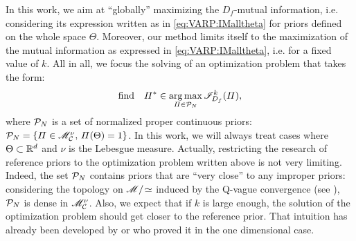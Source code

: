 In this work, we aim at ``globally'' maximizing the $D_f$-mutual information, i.e. considering its expression written as in \cref{eq:VARP:IMalltheta} for priors defined on the whole space $\Theta$.
Moreover, our method limits itself to the maximization of the mutual information as expressed in \cref{eq:VARP:IMalltheta}, i.e. for a fixed value of $k$.
All in all, we focus the solving of an optimization problem that takes the form:
    \begin{equation}\label{eq:VARP:optimproblemintro}
        \text{find}\quad\varPi^\ast\in\operatorname*{arg\,max}_{\varPi\in\mathcal{P}_N} \mathscr{I}^k_{D_f}(\varPi),
    \end{equation}
where $\mathcal{P}_N$ is a set of normalized proper continuous priors: $\mathcal{P}_N=\{\varPi\in\mathscr{M}^\nu_{\mathcal{C}},\,\varPi(\Theta)=1 \}$. In this work, we will always treat cases where $\Theta\subset\mathbb{R}^d$ and $\nu$ is the Lebesgue measure.
Actually, restricting the research of reference priors to the optimization problem written above is not very limiting. Indeed, the set $\mathcal{P}_N$ contains priors that are ``very close'' to any improper priors: considering the topology on $\mathscr{M}/\!\simeq$ induced by the Q-vague convergence (see \cite{bioche_approximation_2016}), $\mathcal{P}_N$ is dense in $\mathscr{M}^\nu_{\mathcal{C}}$.
Also, we expect that if $k$ is large enough, the solution of the optimization problem should get closer to the reference prior. That intuition has already been developed by \citet{berger_formal_2009} or \cite{le_formal_2014} who proved it in the one dimensional case.






